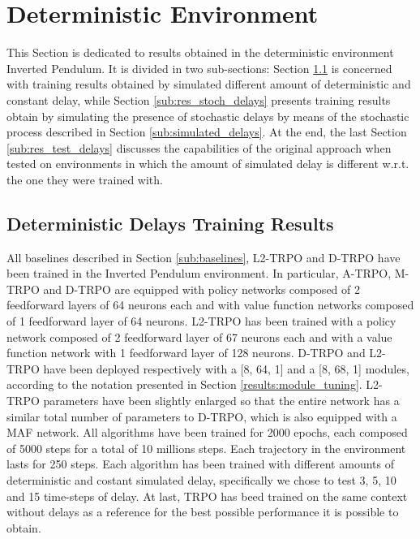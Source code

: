     \section{Deterministic Environment}
    \label{results:deterministic}
        This Section is dedicated to results obtained in the deterministic environment Inverted Pendulum. It is divided in two sub-sections: Section \ref{sub:res_det_delays} is concerned with training results obtained by simulated different amount of deterministic and constant delay, while Section \ref{sub:res_stoch_delays} presents training results obtain by simulating the presence of stochastic delays by means of the stochastic process described in Section \ref{sub:simulated_delays}. At the end, the last Section \ref{sub:res_test_delays} discusses the capabilities of the original approach when tested on environments in which the amount of simulated delay is different w.r.t. the one they were trained with. 
        
        \subsection{Deterministic Delays Training Results}
        \label{sub:res_det_delays}
            All baselines described in Section \ref{sub:baselines}, L2-TRPO and D-TRPO have been trained in the Inverted Pendulum environment. In particular, A-TRPO, M-TRPO and D-TRPO are equipped with policy networks composed of 2 feedforward layers of 64 neurons each and with value function networks composed of 1 feedforward layer of 64 neurons. L2-TRPO has been trained with a policy network composed of 2 feedforward layer of 67 neurons each and with a value function network with 1 feedforward layer of 128 neurons. D-TRPO and L2-TRPO have been deployed respectively with a [8, 64, 1] and a [8, 68, 1] modules, according to the notation presented in Section \ref{results:module_tuning}. L2-TRPO parameters have been slightly enlarged so that the entire network has a similar total number of parameters to D-TRPO, which is also equipped with a MAF network. All algorithms have been trained for 2000 epochs, each composed of 5000 steps for a total of 10 millions steps. Each trajectory in the environment lasts for 250 steps. Each algorithm has been trained with different amounts of deterministic and costant simulated delay, specifically we chose to test 3, 5, 10 and 15 time-steps of delay. At last, TRPO has beed trained on the same context without delays as a reference for the best possible performance it is possible to obtain.
            
